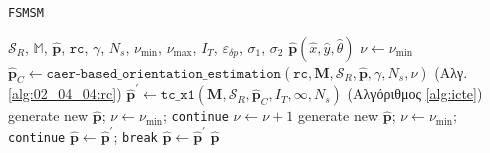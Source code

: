 \begin{algorithm}
  \caption{\texttt{FSMSM}}
  \label{alg:algorithm_fsmsm}
  \begin{spacing}{1.5}
  \begin{algorithmic}[1]
    \REQUIRE $\mathcal{S}_R$, $\mathbb{M}$, $\hat{\bm{p}}$, $\texttt{rc}$,  $\gamma$, $N_s$, $\nu_{\min}$, $\nu_{\max}$, $I_T$, $\varepsilon_{\delta p}$, $\sigma_1$, $\sigma_2$
    \ENSURE $\hat{\bm{p}}(\hat{x}, \hat{y}, \hat{\theta})$
    \STATE $\nu \leftarrow \nu_{\min}$
    \WHILE {$\nu \leq \nu_{\max}$}
      \STATE $\hat{\bm{p}}_C \leftarrow \texttt{caer-based\_orientation\_estimation}(\texttt{rc}, \bm{M}, \mathcal{S}_R, \hat{\bm{p}}, \gamma, N_s, \nu)$ \hfill (Αλγ. \ref{alg:02_04_04:rc})
      \STATE $\hat{\bm{p}}^{\prime} \leftarrow \texttt{tc\_x1}(\bm{M}, \mathcal{S}_R, \hat{\bm{p}}_C, I_T, \infty, N_s)$  \hfill (Αλγόριθμος \ref{alg:icte})
        \STATE generate new $\hat{\bm{p}}$; $\nu \leftarrow \nu_{\min}$; \texttt{continue}
      \ENDIF {}
        \STATE $\nu \leftarrow \nu + 1$
      \ENDIF {}
          \STATE generate new $\hat{\bm{p}}$; $\nu \leftarrow \nu_{\min}$; \texttt{continue}
        \ELSE
          \STATE $\hat{\bm{p}} \leftarrow \hat{\bm{p}}^{\prime}$; \texttt{break}
        \ENDIF
      \ENDIF {}
      \STATE $\hat{\bm{p}} \leftarrow \hat{\bm{p}}^{\prime}$
    \ENDWHILE
    \RETURN $\hat{\bm{p}}$
  \end{algorithmic}
  \end{spacing}
\end{algorithm}

